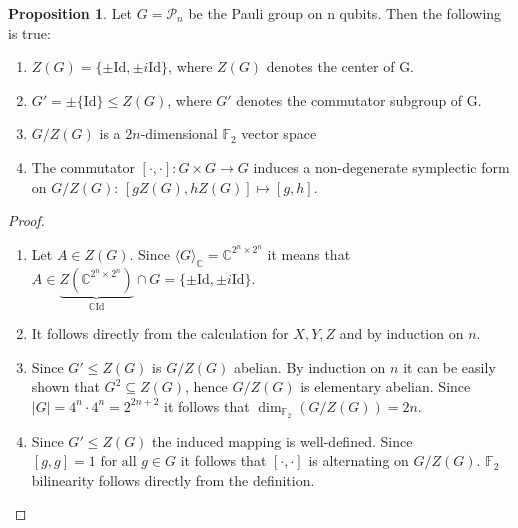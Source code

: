 \documentclass{article}
\def\P{\mathcal{P}}
\def\F{\mathbb{F}}
\def\C{\mathbb{C}}
\def\fa{\text{ for all }}
\def\Id{\text{Id}}
\theoremstyle{definition}
\newtheorem{prop}[Satz]{Proposition}
\begin{document}
\begin{prop} Let $G = \P_n$ be the Pauli group on n qubits. Then the following is true:
\begin{enumerate}
\item $Z(G) = \{ \pm \Id, \pm i \Id \}$, where $Z(G)$ denotes the center of G.
\item $G' = \pm \{ \Id \} \leq Z(G)$, where $G'$ denotes the commutator subgroup of G.
\item $G/Z(G)$ is a $2n$-dimensional $\F_2$ vector space
\item The commutator $[\cdot,\cdot] : G \times G \rightarrow G$ induces a non-degenerate symplectic form on $G/Z(G)$: $[gZ(G),hZ(G)] \mapsto [g,h]$. 
\end{enumerate}

\begin{proof}\label{pauliprops}
\begin{enumerate}
\item Let $A \in Z(G)$. Since $\langle G \rangle_\C = \C^{2^n \times 2^n}$ it means that $A \in \underbrace{Z(\C^{2^n \times 2^n})}_{ \C \Id} \cap G = \{ \pm \Id, \pm i \Id \}$.
\item It follows directly from the calculation for $X,Y,Z$ and by induction on $n$.
\item Since $G' \leq Z(G)$ is $G/Z(G)$ abelian. By induction on $n$ it can be easily shown that $G^2 \subseteq Z(G)$, hence $G/Z(G)$ is elementary abelian. Since $|G| = 4^n \cdot 4^n = 2^{2n+2}$ it follows that $\dim_{\F_2}(G/Z(G)) = 2n$.
\item Since $G' \leq Z(G)$ the induced mapping is well-defined. Since $[g,g] = 1 \fa g \in G$ it follows that $[\cdot,\cdot]$ is alternating on $G/Z(G)$. $\F_2$ bilinearity follows directly from the definition.
\end{enumerate}
\end{proof}
\end{prop}
\end{document}
